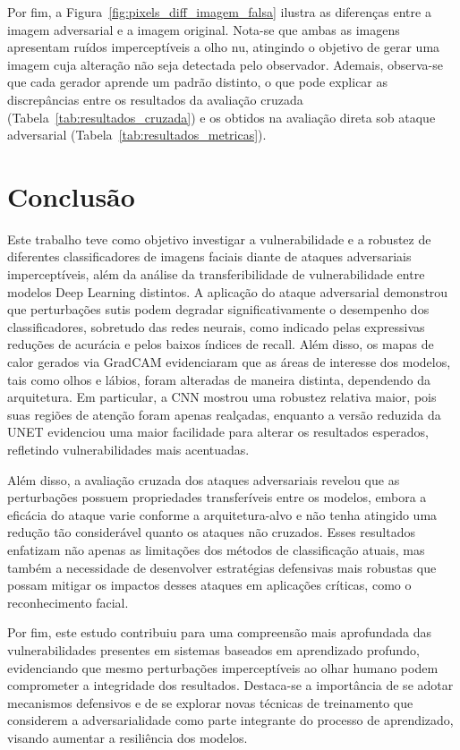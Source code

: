 \documentclass[12pt]{article}
\begin{document}
Por fim, a Figura~\ref{fig:pixels_diff_imagem_falsa} ilustra as diferenças
entre a imagem adversarial e a imagem original. Nota-se que ambas as imagens
apresentam ruídos imperceptíveis a olho nu, atingindo o objetivo de gerar uma
imagem cuja alteração não seja detectada pelo observador. Ademais, observa-se
que cada gerador aprende um padrão distinto, o que pode explicar as
discrepâncias entre os resultados da avaliação cruzada
(Tabela~\ref{tab:resultados_cruzada}) e os obtidos na avaliação direta sob
ataque adversarial (Tabela~\ref{tab:resultados_metricas}).

\section{Conclusão}

Este trabalho teve como objetivo investigar a vulnerabilidade e a robustez de
diferentes classificadores de imagens faciais diante de ataques adversariais
imperceptíveis, além da análise da transferibilidade de vulnerabilidade entre
modelos Deep Learning distintos. A aplicação do ataque adversarial demonstrou
que perturbações sutis podem degradar significativamente o desempenho dos
classificadores, sobretudo das redes neurais, como indicado pelas expressivas
reduções de acurácia e pelos baixos índices de recall. Além disso, os mapas de
calor gerados via GradCAM evidenciaram que as áreas de interesse dos modelos,
tais como olhos e lábios, foram alteradas de maneira distinta, dependendo da
arquitetura. Em particular, a CNN mostrou uma robustez relativa maior, pois
suas regiões de atenção foram apenas realçadas, enquanto a versão reduzida da
UNET evidenciou uma maior facilidade para alterar os resultados esperados,
refletindo vulnerabilidades mais acentuadas.

Além disso, a avaliação cruzada dos ataques adversariais revelou que as
perturbações possuem propriedades transferíveis entre os modelos, embora a
eficácia do ataque varie conforme a arquitetura-alvo e não tenha atingido uma
redução tão considerável quanto os ataques não cruzados. Esses resultados
enfatizam não apenas as limitações dos métodos de classificação atuais, mas
também a necessidade de desenvolver estratégias defensivas mais robustas que
possam mitigar os impactos desses ataques em aplicações críticas, como o
reconhecimento facial.

Por fim, este estudo contribuiu para uma compreensão mais aprofundada das
vulnerabilidades presentes em sistemas baseados em aprendizado profundo,
evidenciando que mesmo perturbações imperceptíveis ao olhar humano podem
comprometer a integridade dos resultados. Destaca-se a importância de se adotar
mecanismos defensivos e de se explorar novas técnicas de treinamento que
considerem a adversarialidade como parte integrante do processo de aprendizado,
visando aumentar a resiliência dos modelos.



\nocite{*}
\end{document}
